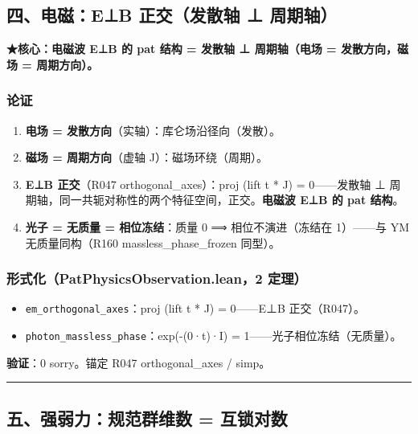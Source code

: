 \documentclass[
]{article}
\providecommand{\tightlist}{%
  \setlength{\itemsep}{0pt}\setlength{\parskip}{0pt}}
\begin{document}
\subsection{四、电磁：E⊥B 正交（发散轴 ⊥
周期轴）}\label{ux56dbux7535ux78c1eb-ux6b63ux4ea4ux53d1ux6563ux8f74-ux5468ux671fux8f74}

\textbf{★核心：电磁波 E⊥B 的 pat 结构 = 发散轴 ⊥ 周期轴（电场 =
发散方向，磁场 = 周期方向）。}

\subsubsection{论证}\label{ux8bbaux8bc1-3}

\begin{enumerate}
\def\labelenumi{\arabic{enumi}.}
\tightlist
\item
  \textbf{电场 = 发散方向}（实轴）：库仑场沿径向（发散）。
\item
  \textbf{磁场 = 周期方向}（虚轴 J）：磁场环绕（周期）。
\item
  \textbf{E⊥B 正交}（R047 orthogonal\_axes）：proj (lift t * J) =
  0------发散轴 ⊥
  周期轴，同一共轭对称性的两个特征空间，正交。\textbf{电磁波 E⊥B 的 pat
  结构}。
\item
  \textbf{光子 = 无质量 = 相位冻结}：质量 0 ⟹ 相位不演进（冻结在
  1）------与 YM 无质量同构（R160 massless\_phase\_frozen 同型）。
\end{enumerate}

\subsubsection{形式化（PatPhysicsObservation.lean，2
定理）}\label{ux5f62ux5f0fux5316patphysicsobservation.lean2-ux5b9aux7406-1}

\begin{itemize}
\tightlist
\item
  \texttt{em\_orthogonal\_axes}：proj (lift t * J) = 0------E⊥B
  正交（R047）。
\item
  \texttt{photon\_massless\_phase}：exp(-(0·t)·I) =
  1------光子相位冻结（无质量）。
\end{itemize}

\textbf{验证}：0 sorry。锚定 R047 orthogonal\_axes / simp。

\begin{center}\rule{0.5\linewidth}{0.5pt}\end{center}

\subsection{五、强弱力：规范群维数 =
互锁对数}\label{ux4e94ux5f3aux5f31ux529bux89c4ux8303ux7fa4ux7ef4ux6570-ux4e92ux9501ux5bf9ux6570}
\end{document}
